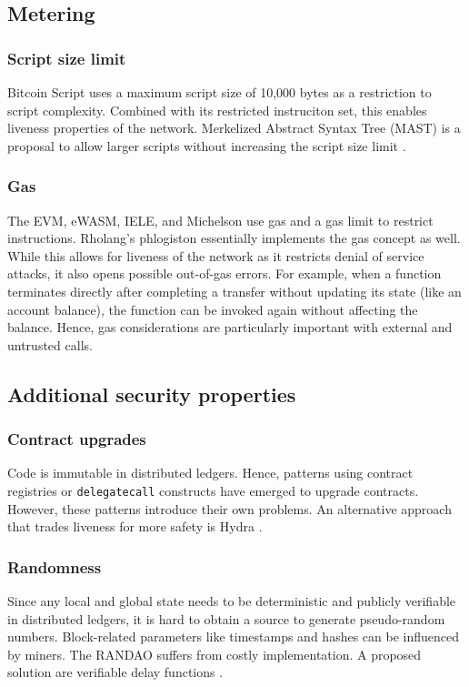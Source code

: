 
\subsection{Metering}

\subsubsection{Script size limit}
Bitcoin Script uses a maximum script size of 10,000 bytes as a restriction to script complexity. Combined with its restricted instruciton set, this enables liveness properties of the network. Merkelized Abstract Syntax Tree (MAST) is a proposal to allow larger scripts without increasing the script size limit \cite{Harding2017}.

\subsubsection{Gas}
The EVM, eWASM, IELE, and Michelson use gas and a gas limit to restrict instructions. Rholang's phlogiston essentially implements the gas concept as well. While this allows for liveness of the network as it restricts denial of service attacks, it also opens possible out-of-gas errors. For example, when a function terminates directly after completing a transfer without updating its state (like an account balance), the function can be invoked again without affecting the balance.
Hence, gas considerations are particularly important with external and untrusted calls.


\subsection{Additional security properties} 
\subsubsection{Contract upgrades}
Code is immutable in distributed ledgers. Hence, patterns using contract registries or \texttt{delegatecall} constructs have emerged to upgrade contracts. However, these patterns introduce their own problems. An alternative approach that trades liveness for more safety is Hydra \cite{Breidenbach2018}.

\subsubsection{Randomness}
Since any local and global state needs to be deterministic and publicly verifiable in distributed ledgers, it is hard to obtain a source to generate pseudo-random numbers.
Block-related parameters like timestamps and hashes can be influenced by miners. The RANDAO suffers from costly implementation. A proposed solution are verifiable delay functions \cite{Boneh2018}.

